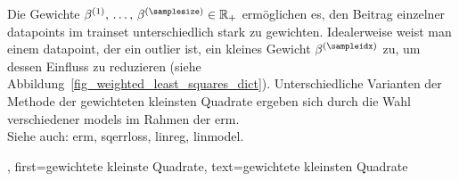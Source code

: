 {{{{{{\begin{figure}[H]
        \end{figure}
        Die Gewichte $\beta^{(1)}, \,\ldots, \,\beta^{(\samplesize)} \in \mathbb{R}_{+}$
        ermöglichen es, den Beitrag einzelner \glspl{datapoint} im \gls{trainset}
        unterschiedlich stark zu gewichten. Idealerweise weist man einem \gls{datapoint},
        der ein \gls{outlier} ist, ein kleines Gewicht $\beta^{(\sampleidx)}$ zu,
        um dessen Einfluss zu reduzieren (siehe Abbildung~\ref{fig_weighted_least_squares_dict}).
        Unterschiedliche Varianten der Methode der gewichteten kleinsten Quadrate
        ergeben sich durch die Wahl verschiedener \glspl{model} im Rahmen der \gls{erm}.
        \\
        Siehe auch: \gls{erm}, \gls{sqerrloss}, \gls{linreg}, \gls{linmodel}.
    },
    first={gewichtete kleinste Quadrate},
    text={gewichtete kleinsten Quadrate}
}

}}}}
